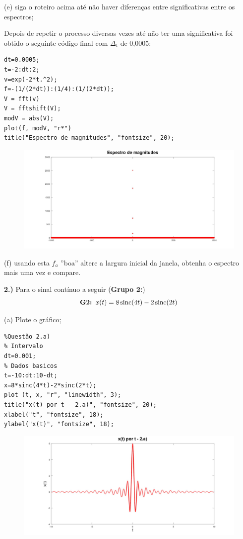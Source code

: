 \documentclass[10pt]{article}
\DeclareMathOperator{\sinc}{sinc}
\begin{document}
(e) siga o roteiro acima até não haver diferenças entre significativas entre os espectros;

\vspace{\baselineskip}
Depois de repetir o processo diversas vezes até não ter uma significativa foi obtido o seguinte código final com $\Delta_t$ de 0,0005:

\begin{verbatim}
dt=0.0005;
t=-2:dt:2;
v=exp(-2*t.^2);
f=-(1/(2*dt)):(1/4):(1/(2*dt));
V = fft(v)
V = fftshift(V);
modV = abs(V);
plot(f, modV, "r*")
title("Espectro de magnitudes", "fontsize", 20);    
\end{verbatim}

\begin{figure}[h]
    \includegraphics[scale=0.2]{questao1e}
    \centering
\end{figure}

(f) usando esta $f_a$ ''boa'' altere a largura inicial da janela, obtenha o espectro mais uma vez e compare.


\vspace{\baselineskip}


\textbf{2.)} Para o sinal contínuo a seguir (\textbf{Grupo 2:})
\[\text{\textbf{G2: }} x(t) = 8\sinc(4t) - 2\sinc(2t)\]

(a) Plote o gráfico;

\begin{verbatim}
%Questão 2.a)
% Intervalo
dt=0.001;
% Dados basicos
t=-10:dt:10-dt;
x=8*sinc(4*t)-2*sinc(2*t);
plot (t, x, "r", "linewidth", 3);
title("x(t) por t - 2.a)", "fontsize", 20);
xlabel("t", "fontsize", 18);
ylabel("x(t)", "fontsize", 18);
\end{verbatim}

\begin{figure}[h]
    \includegraphics[scale=0.25]{questao2a}
    \centering
\end{figure}
\end{document}
